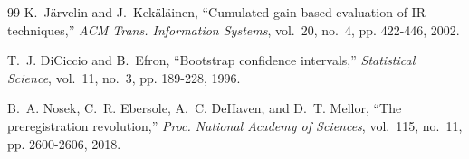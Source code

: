 \documentclass[journal]{IEEEtran}
\begin{document}
\begin{thebibliography}{99}
 K.~J\"arvelin and J.~Kek\"al\"ainen, ``Cumulated gain-based evaluation of IR techniques,'' \emph{ACM Trans. Information Systems}, vol.~20, no.~4, pp. 422-446, 2002.

 T.~J. DiCiccio and B.~Efron, ``Bootstrap confidence intervals,'' \emph{Statistical Science}, vol.~11, no.~3, pp. 189-228, 1996.

 B.~A. Nosek, C.~R. Ebersole, A.~C. DeHaven, and D.~T. Mellor, ``The preregistration revolution,'' \emph{Proc. National Academy of Sciences}, vol.~115, no.~11, pp. 2600-2606, 2018.

\end{thebibliography}
\end{document}
